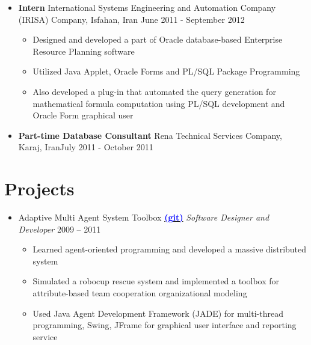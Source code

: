 \documentclass[letter]{res}
\begin{document}
\begin{resume}
\begin{itemize}[leftmargin=-.1in]
\item \textbf{Intern} \newline
International Systems Engineering and Automation Company (IRISA) Company, Isfahan, Iran \hfill June 2011 - September 2012\\
	\vspace{-4mm}
    \iflong
      \begin{itemize}
          \item Designed and developed a part of Oracle database-based Enterprise Resource Planning software
          \item Utilized Java Applet, Oracle Forms and PL/SQL Package Programming
          \item Also developed a plug-in that automated the query generation for mathematical formula computation using PL/SQL development and Oracle Form graphical user
      \end{itemize}
    \fi

\item \textbf{Part-time Database Consultant}
\newline
Rena Technical Services Company, Karaj, Iran\hfill July 2011 - October 2011\\
	\vspace{-4mm}

\end{itemize}


\section{Projects}
\begin{itemize}[leftmargin=-.1in]
\item Adaptive Multi Agent System Toolbox {\href{https://github.com/omid55/team_based_rescue_jade_multi_agent_system}{\textbf{\textcolor{blue}{(git)}}}} \newline
{\sl Software Designer and Developer} \hfill 2009 – 2011\\
  \vspace{-4mm}
  \iflong
    \begin{itemize}
    \item Learned agent-oriented programming and developed a massive distributed system
    \item Simulated a robocup rescue system and implemented a toolbox for 				attribute-based team cooperation organizational modeling
    \item Used Java Agent Development Framework (JADE) for multi-thread programming, 		Swing, JFrame for graphical user interface and reporting service
    \end{itemize}
  \fi


\end{itemize}
\end{resume}
\end{document}
